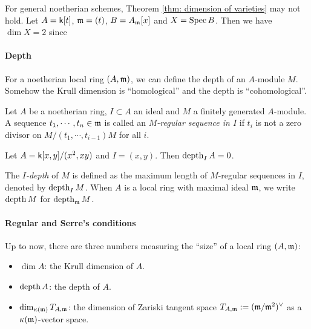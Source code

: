     \begin{example}
        For general noetherian schemes, Theorem \ref{thm: dimension of varieties} may not hold.
        Let $A = {\mathsf{k}}[t]$, ${\mathfrak{m}} = (t)$, $B=A_{\mathfrak{m}}[x]$ and $X = \operatorname{Spec} B$.
        Then we have $\dim X = 2$ since 
    \end{example}


    \paragraph{Depth}
    For a noetherian local ring $(A,{\mathfrak{m}})$, we can define the depth of an $A$-module $M$.
    Somehow the Krull dimension is ``homological'' and the depth is ``cohomological''.

    \begin{definition}\label{def: regular sequence}
        Let $A$ be a noetherian ring, $I \subset A$ an ideal and $M$ a finitely generated $A$-module.
        A sequence $t_1,\cdots,t_n\in {\mathfrak{m}}$ is called an \textit{$M$-regular sequence in $I$} if $t_i$ is not a zero divisor on $M/(t_1,\cdots,t_{i-1})M$ for all $i$. 
    \end{definition}

    \begin{example}
        Let $A = {\mathsf{k}}[x,y]/(x^2,xy)$ and $I = (x,y)$.
        Then $\operatorname{depth}_I A = 0$.
    \end{example}



    \begin{definition}
        The \textit{$I$-depth} of $M$ is defined as the maximum length of $M$-regular sequences in $I$, denoted by $\operatorname{depth}_I M$. 
        When $A$ is a local ring with maximal ideal ${\mathfrak{m}}$, we write $\operatorname{depth} M$ for $\operatorname{depth}_{{\mathfrak{m}}} M$.
    \end{definition}

    \paragraph{Regular and Serre's conditions}
    Up to now, there are three numbers measuring the ``size'' of a local ring $(A,{\mathfrak{m}})$:
    \begin{itemize}
        \item $\dim A$: the Krull dimension of $A$.
        \item $\operatorname{depth} A$: the depth of $A$.
        \item $\dim_{{\kappa}({\mathfrak{m}})} T_{A,{\mathfrak{m}}}$: the dimension of Zariski tangent space $T_{A,{\mathfrak{m}}} := ({\mathfrak{m}}/{\mathfrak{m}}^2)^\lor$ as a ${{\kappa}({\mathfrak{m}})}$-vector space.
    \end{itemize}

